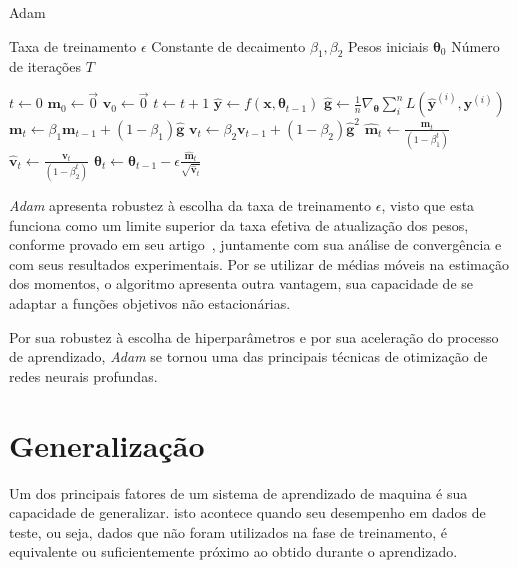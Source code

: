 \begin{algorithm}
    \caption{Adam}
    \label{al:adam}
    \begin{algorithmic}[1]
        \Require Taxa de treinamento $\epsilon$
        \Require Constante de decaimento $\beta_{1}, \beta_{2}$
        \Require Pesos iniciais $\boldsymbol{\theta}_{0}$
        \Require Número de iterações $T$

        \State $t \gets 0$
        \State $\mathbf{m}_{0} \gets \vec{0}$
        \State $\mathbf{v}_{0} \gets \vec{0}$
            \State $t \gets t + 1$
            \State $\mathbf{\hat{y}} \gets f(\mathbf{x}, \boldsymbol{\theta}_{t-1})$
            \State $\mathbf{\hat{g}} \gets \frac{1}{n} \nabla_{\boldsymbol{\theta}} \sum_i^n L(\mathbf{\hat{y}}^{(i)}, \mathbf{y}^{(i)})$
            \State $\mathbf{m}_{t} \gets \beta_{1} \mathbf{m}_{t-1} + (1 - \beta_{1}) \mathbf{\hat{g}}$
            \State $\mathbf{v}_{t} \gets \beta_{2} \mathbf{v}_{t-1} + (1 - \beta_{2}) \mathbf{\hat{g}}^{2}$
            \State $\mathbf{\hat{m}}_{t} \gets \frac{\mathbf{m}_{t}}{(1 - \beta_{1}^{t})}$
            \State $\mathbf{\hat{v}}_{t} \gets \frac{\mathbf{v}_{t}}{(1 - \beta_{2}^{t})}$
            \State $\boldsymbol{\theta}_{t} \gets \boldsymbol{\theta}_{t-1} - \epsilon \frac{\mathbf{\hat{m}}_{t}}{\sqrt{\mathbf{\hat{v}}_{t}}} $
        \EndWhile
    \end{algorithmic}
\end{algorithm}

\textit{Adam} apresenta robustez à escolha da taxa de treinamento $\epsilon$, visto que esta funciona como um limite
superior da taxa efetiva de atualização dos pesos, conforme provado em seu artigo~\cite{kingma14}, juntamente com sua
análise de convergência e com seus resultados experimentais.
Por se utilizar de médias móveis na estimação dos momentos, o algoritmo apresenta outra vantagem, sua capacidade de se
adaptar a funções objetivos não estacionárias.

Por sua robustez à escolha de hiperparâmetros e por sua aceleração do processo de aprendizado, \textit{Adam} se tornou
uma das principais técnicas de otimização de redes neurais profundas.

\section{Generalização} \label{sec:generalizacao}

Um dos principais fatores de um sistema de aprendizado de maquina é sua capacidade de generalizar.
isto acontece quando seu desempenho em dados de teste, ou seja, dados que não foram utilizados na fase de treinamento,
é equivalente ou suficientemente próximo ao obtido durante o aprendizado.

